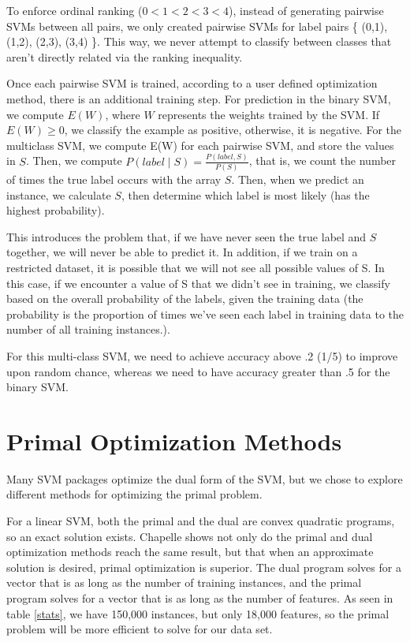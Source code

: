 \documentclass[letterpaper, 11pt]{article}
\begin{document}
To enforce ordinal ranking ($0 < 1 < 2 < 3 < 4$), instead of generating pairwise SVMs between all pairs, we only created pairwise SVMs for label pairs \{ (0,1), (1,2), (2,3), (3,4) \}.  This way, we never attempt to classify between classes that aren't directly related via the ranking inequality.

Once each pairwise SVM is trained, according to a user defined optimization method, there is an additional training step.  For prediction in the binary SVM, we compute $E(W)$, where $W$ represents the weights trained by the SVM.  If $E(W) \ge 0$, we classify the example as positive, otherwise, it is negative.  For the multiclass SVM, we compute E(W) for each pairwise SVM, and store the values in $S$.  Then, we compute $P(label \mid S) = \frac{P(label, S)}{P(S)}$, that is, we count the number of times the true label occurs with the array $S$.  Then, when we predict an instance, we calculate $S$, then determine which label is most likely (has the highest probability).

This introduces the problem that, if we have never seen the true label and $S$ together, we will never be able to predict it.  In addition, if we train on a restricted dataset, it is possible that we will not see all possible values of S.  In this case, if we encounter a value of S that we didn't see in training, we classify based on the overall probability of the labels, given the training data (the probability is the proportion of times we've seen each label in training data to the number of all training instances.).

For this multi-class SVM, we need to achieve accuracy above .2 (1/5) to improve upon random chance, whereas we need to have accuracy greater than .5 for the binary SVM.

\section{Primal Optimization Methods}
Many SVM packages optimize the dual form of the SVM, but we chose to explore different methods for optimizing the primal problem.

For a linear SVM, both the primal and the dual are convex quadratic programs, so an exact solution exists.  Chapelle shows not only do  the primal and dual optimization methods reach the same result, but that when an approximate solution is desired, primal optimization is superior\cite{chapelle2007training}.  The  dual program solves for a vector that is as long as the number of training instances, and the primal program solves for a vector that is as long as the number of features.  As seen in table \ref{stats}, we have 150,000 instances, but only 18,000 features, so the primal problem will be more efficient to solve for our data set.
\end{document}
